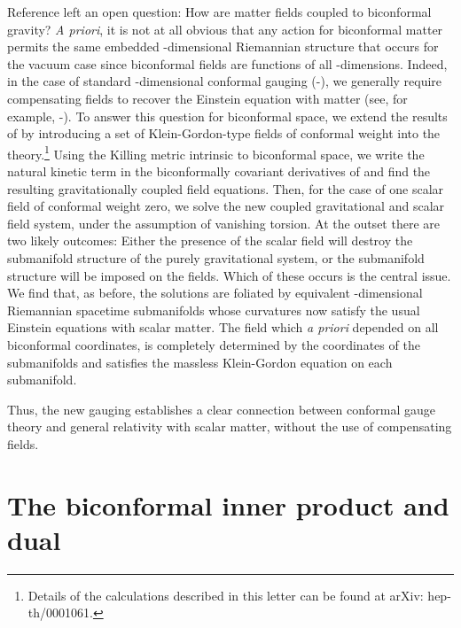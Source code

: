\documentclass[a4paper,a4paper]{article}
\begin{document}
Reference \cite{WW} left an open question: How are matter fields coupled to
biconformal gravity? \textit{A priori}, it is not at all obvious that any
action for biconformal matter permits the same embedded \coordHE{}-dimensional
Riemannian structure that occurs for the vacuum case since biconformal
fields are functions of all \coordHE{}-dimensions. Indeed, in the case of standard \coordHE{}-dimensional conformal gauging (\cite{Romao+Ferber+Freund}-\cite{Kaku+Townsend2}), we generally require compensating fields to recover the Einstein equation with
matter (see, for example, \cite{Deser}-\cite{van Nieuwenhuizen}). To answer
this question for biconformal space, we extend the results of \cite{WW} by
introducing a set of Klein-Gordon-type fields \coordHE{} of conformal
weight \coordHE{} into the theory.\footnote{%
Details of the calculations described in this letter can be found at arXiv:
hep-th/0001061.} Using the Killing metric intrinsic to biconformal space, we
write the natural kinetic term in the biconformally covariant derivatives of 
\coordHE{} and find the resulting gravitationally coupled field equations.
Then, for the case of one scalar field \myHighlight{$\phi $}\coordHE{} of conformal weight zero, we
solve the new coupled gravitational and scalar field system, under the
assumption of vanishing torsion. At the outset there are two likely
outcomes: Either the presence of the scalar field will destroy the
submanifold structure of the purely gravitational system, or the submanifold
structure will be imposed on the fields. Which of these occurs is the
central issue. We find that, as before, the solutions are foliated by
equivalent \coordHE{}-dimensional Riemannian spacetime submanifolds whose
curvatures now satisfy the usual Einstein equations with scalar matter. The
field \myHighlight{$\phi ,$}\coordHE{} which \textit{a priori }depended on all \coordHE{} biconformal
coordinates, is completely determined by the \coordHE{} coordinates of the
submanifolds and satisfies the massless Klein-Gordon equation on each
submanifold.

Thus, the new gauging establishes a clear connection between conformal gauge
theory and general relativity with scalar matter, without the use of
compensating fields.

\section{The biconformal inner product and dual}
\end{document}
